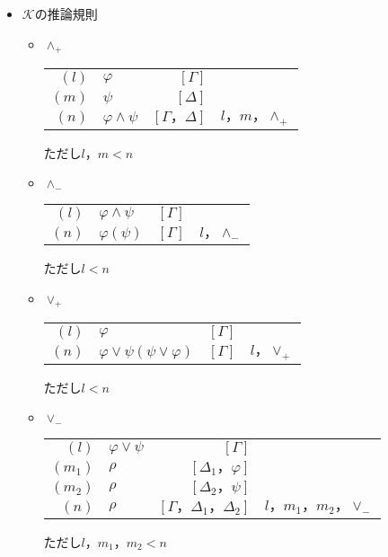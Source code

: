 \documentclass[10pt,b5paper,papersize,dvipdfmx]{jsbook}
\begin{document}
\begin{itemize}
\item $\mathcal K$の推論規則
\begin{itemize}
\item $\land_+$
\begin{table}[H]
\begin{center}
\begin{tabular}{rlrl}
$(l)$&$\varphi$&$[\Gamma]$& \\
$(m)$&$\psi$&$[\Delta]$& \\
$(n)$&$\varphi \land \psi$&$[\Gamma，\Delta]$&$l，m，\land_+$
\end{tabular}
\end{center}
\end{table}
ただし$l，m<n$
\item $\land_-$
\begin{table}[H]
\begin{center}
\begin{tabular}{rlrl}
$(l)$&$\varphi \land \psi$&$[\Gamma]$& \\
$(n)$&$\varphi (\psi)$&$[\Gamma]$&$l，\land_-$ \\
\end{tabular}
\end{center}
\end{table}
ただし$l<n$
\item $\lor_+$
\begin{table}[H]
\begin{center}
\begin{tabular}{rlrl}
$(l)$&$\varphi$&$[\Gamma]$& \\
$(n)$&$\varphi \lor \psi (\psi \lor \varphi)$&$[\Gamma]$&$l，\lor_+$
\end{tabular}
\end{center}
\end{table}
ただし$l<n$
\item $\lor_-$
\begin{table}[H]
\begin{center}
\begin{tabular}{rlrl}
$(l)$&$\varphi \lor \psi$&$[\Gamma]$& \\
$(m_1)$&$\rho$&$[\Delta_1，\varphi]$& \\
$(m_2)$&$\rho$&$[\Delta_2，\psi]$& \\
$(n)$&$\rho$&$[\Gamma，\Delta_1，\Delta_2]$&$l，m_1，m_2，\lor_-$
\end{tabular}
\end{center}
\end{table}
ただし$l，m_1，m_2<n$

\end{itemize}
\end{itemize}
\end{document}
